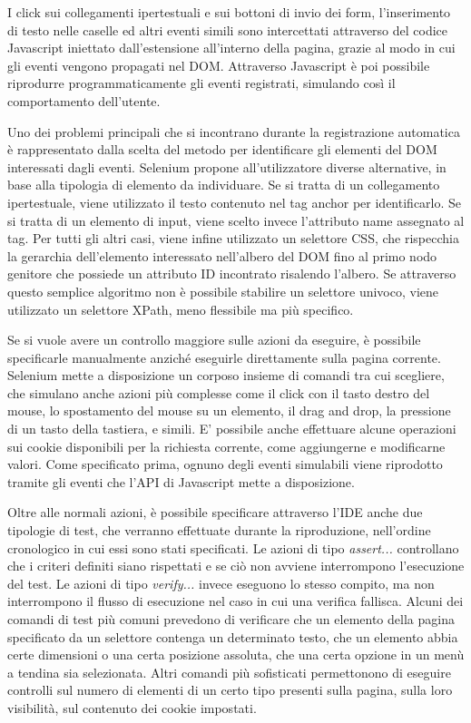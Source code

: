 I click sui collegamenti ipertestuali e sui bottoni di invio dei form, l'inserimento di testo nelle caselle ed altri eventi simili sono intercettati attraverso del codice Javascript iniettato dall'estensione all'interno della pagina, grazie al modo in cui gli eventi vengono propagati nel DOM. Attraverso Javascript è poi possibile riprodurre programmaticamente gli eventi registrati, simulando così il comportamento dell'utente.

Uno dei problemi principali che si incontrano durante la registrazione automatica è rappresentato dalla scelta del metodo per identificare gli elementi del DOM interessati dagli eventi. Selenium propone all'utilizzatore diverse alternative, in base alla tipologia di elemento da individuare. Se si tratta di un collegamento ipertestuale, viene utilizzato il testo contenuto nel tag anchor per identificarlo. Se si tratta di un elemento di input, viene scelto invece l'attributo name assegnato al tag. Per tutti gli altri casi, viene infine utilizzato un selettore CSS, che rispecchia la gerarchia dell'elemento interessato nell'albero del DOM fino al primo nodo genitore che possiede un attributo ID incontrato risalendo l'albero. Se attraverso questo semplice algoritmo non è possibile stabilire un selettore univoco, viene utilizzato un selettore XPath, meno flessibile ma più specifico.

Se si vuole avere un controllo maggiore sulle azioni da eseguire, è possibile specificarle manualmente anziché eseguirle direttamente sulla pagina corrente. Selenium mette a disposizione un corposo insieme di comandi tra cui scegliere, che simulano anche azioni più complesse come il click con il tasto destro del mouse, lo spostamento del mouse su un elemento, il drag and drop, la pressione di un tasto della tastiera, e simili. E' possibile anche effettuare alcune operazioni sui cookie disponibili per la richiesta corrente, come aggiungerne e modificarne valori. Come specificato prima, ognuno degli eventi simulabili viene riprodotto tramite gli eventi che l'API di Javascript mette a disposizione. 

Oltre alle normali azioni, è possibile specificare attraverso l'IDE anche due tipologie di test, che verranno effettuate durante la riproduzione, nell'ordine cronologico in cui essi sono stati specificati. Le azioni di tipo \emph{assert...} controllano che i criteri definiti siano rispettati e se ciò non avviene interrompono l'esecuzione del test. Le azioni di tipo \emph{verify...} invece eseguono lo stesso compito, ma non interrompono il flusso di esecuzione nel caso in cui una verifica fallisca.
Alcuni dei comandi di test più comuni prevedono di verificare che un elemento della pagina specificato da un selettore contenga un determinato testo, che un elemento abbia certe dimensioni o una certa posizione assoluta, che una certa opzione in un menù a tendina sia selezionata. Altri comandi più sofisticati permettonono di eseguire controlli sul numero di elementi di un certo tipo presenti sulla pagina, sulla loro visibilità, sul contenuto dei cookie impostati.

